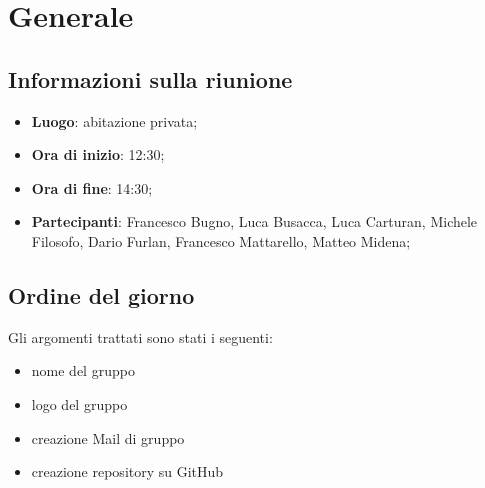 \section{Generale}

\vspace{10pt}


\subsection{Informazioni sulla riunione}
\begin{itemize}
	\item \textbf{Luogo}: abitazione privata;
	\item \textbf{Ora di inizio}: 12:30;
	\item \textbf{Ora di fine}: 14:30;
	\item \textbf{Partecipanti}: Francesco Bugno, Luca Busacca, Luca Carturan, Michele Filosofo, Dario Furlan, Francesco Mattarello, Matteo Midena;
\end{itemize}

\vspace{5pt}

\subsection{Ordine del giorno}
Gli argomenti trattati sono stati i seguenti:
\begin{itemize}
	\item nome del gruppo
	\item logo del gruppo
	\item creazione Mail di gruppo
	\item creazione repository su GitHub\glo
\end{itemize}
